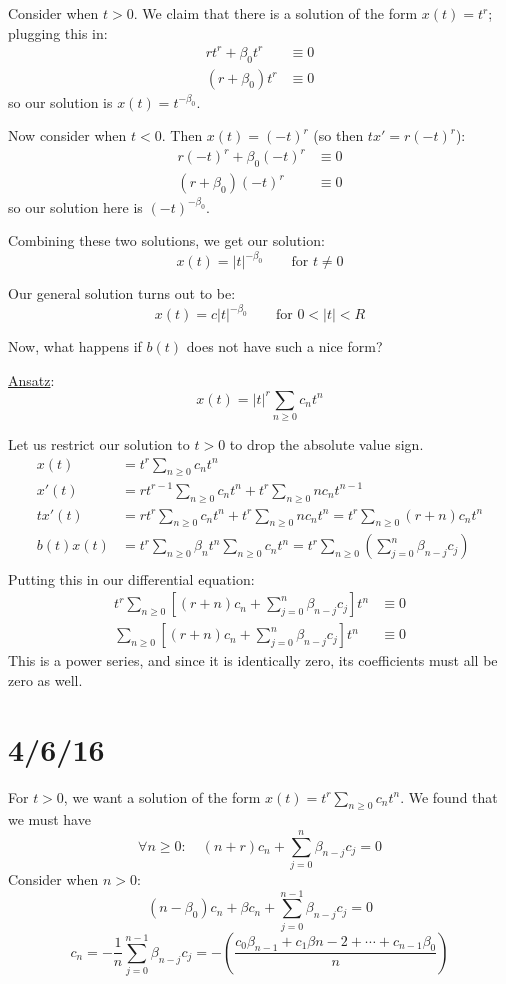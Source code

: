 \documentclass[12pt]{article}
\begin{document}
Consider when $t>0$. We claim that there is a solution of the form $x(t) = t^r$; plugging this in:
\[
\begin{aligned}
  rt^r + \beta_0t^r &\equiv 0 \\
  (r+ \beta_0)t^r &\equiv 0
\end{aligned}
\]
so our solution is $x(t) = t^{-\beta_0}$. 

Now consider when $t<0$. Then $x(t) = (-t)^r$ (so then $tx' = r(-t)^r$):
\[
\begin{aligned}
  r(-t)^r + \beta_0(-t)^r &\equiv 0 \\
  (r+\beta_0)(-t)^r &\equiv 0
\end{aligned}
\]
so our solution here is $(-t)^{-\beta_0}$.

Combining these two solutions, we get our solution:
\[ x(t) = |t|^{-\beta_0} \qquad \text{for } t\neq 0\]

Our general solution turns out to be:
\[ x(t) = c|t|^{-\beta_0} \qquad \text{for } 0 < |t| < R \]

Now, what happens if $b(t)$ does not have such a nice form?

\underline{Ansatz}: \[ x(t) = |t|^r\sum_{n\ge 0} c_nt^n \]

Let us restrict our solution to $t>0$ to drop the absolute value sign.
\[
\begin{aligned}
  x(t) &= t^r \sum_{n \ge 0}c_nt^n \\
  x'(t) &= rt^{r-1} \sum_{n\ge 0} c_nt^n + t^r \sum_{n \ge 0}nc_nt^{n-1} \\
  tx'(t) &= rt^r \sum_{n\ge 0} c_nt^n + t^r \sum_{n \ge 0}nc_nt^n = t^r \sum_{n \ge 0}(r+n)c_nt^n \\
  b(t)x(t) &= t^r \sum_{n \ge 0} \beta_nt^n \sum_{n \ge 0} c_nt^n = t^r \sum_{n \ge 0}\left(\sum_{j = 0}^n \beta_{n-j}c_j\right) \\
\end{aligned}
\]
Putting this in our differential equation:
\[
\begin{aligned}
  t^r\sum_{n \ge 0}\left[(r+n)c_n + \sum_{j=0}^n\beta_{n-j}c_j\right]t^n &\equiv 0 \\
  \sum_{n \ge 0}\left[(r+n)c_n + \sum_{j=0}^n\beta_{n-j}c_j\right]t^n &\equiv 0
\end{aligned}
\]
This is a power series, and since it is identically zero, its coefficients must all be zero as well.

\section{4/6/16}
For $t>0$, we want a solution of the form $x(t) = t^r\sum_{n \ge 0} c_nt^n$. We found that we must have 
\[ \forall n \ge 0: \quad (n+r)c_n +\sum_{j=0}^n \beta_{n-j}c_j = 0 \]
Consider when $n > 0$:
\[ (n - \beta_0)c_n + \beta c_n + \sum_{j=0}^{n-1} \beta_{n-j}c_j = 0 \]
\[ \boxed{c_n = -\frac{1}{n}\sum_{j=0}^{n-1}\beta_{n-j}c_j = -\left(\frac{c_0\beta_{n-1} + c_1\beta{n-2} + \cdots + c_{n-1}\beta_0}{n}\right)} \]
\end{document}
